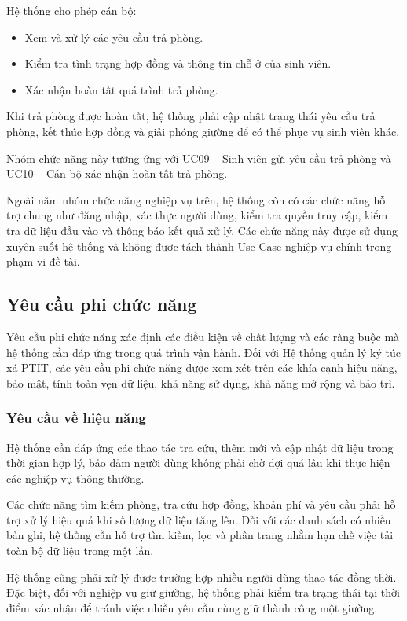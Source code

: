 Hệ thống cho phép cán bộ:

\begin{itemize}[leftmargin=1.4em]
\item Xem và xử lý các yêu cầu trả phòng.
\item Kiểm tra tình trạng hợp đồng và thông tin chỗ ở của sinh viên.
\item Xác nhận hoàn tất quá trình trả phòng.
\end{itemize}

Khi trả phòng được hoàn tất, hệ thống phải cập nhật trạng thái yêu cầu trả phòng, kết thúc hợp đồng và giải phóng giường để có thể phục vụ sinh viên khác.

Nhóm chức năng này tương ứng với UC09 – Sinh viên gửi yêu cầu trả phòng và UC10 – Cán bộ xác nhận hoàn tất trả phòng.

Ngoài năm nhóm chức năng nghiệp vụ trên, hệ thống còn có các chức năng hỗ trợ chung như đăng nhập, xác thực người dùng, kiểm tra quyền truy cập, kiểm tra dữ liệu đầu vào và thông báo kết quả xử lý. Các chức năng này được sử dụng xuyên suốt hệ thống và không được tách thành Use Case nghiệp vụ chính trong phạm vi đề tài.

\subsection{Yêu cầu phi chức năng}

Yêu cầu phi chức năng xác định các điều kiện về chất lượng và các ràng buộc mà hệ thống cần đáp ứng trong quá trình vận hành. Đối với Hệ thống quản lý ký túc xá PTIT, các yêu cầu phi chức năng được xem xét trên các khía cạnh hiệu năng, bảo mật, tính toàn vẹn dữ liệu, khả năng sử dụng, khả năng mở rộng và bảo trì.

\subsubsection{Yêu cầu về hiệu năng}

Hệ thống cần đáp ứng các thao tác tra cứu, thêm mới và cập nhật dữ liệu trong thời gian hợp lý, bảo đảm người dùng không phải chờ đợi quá lâu khi thực hiện các nghiệp vụ thông thường.

Các chức năng tìm kiếm phòng, tra cứu hợp đồng, khoản phí và yêu cầu phải hỗ trợ xử lý hiệu quả khi số lượng dữ liệu tăng lên. Đối với các danh sách có nhiều bản ghi, hệ thống cần hỗ trợ tìm kiếm, lọc và phân trang nhằm hạn chế việc tải toàn bộ dữ liệu trong một lần.

Hệ thống cũng phải xử lý được trường hợp nhiều người dùng thao tác đồng thời. Đặc biệt, đối với nghiệp vụ giữ giường, hệ thống phải kiểm tra trạng thái tại thời điểm xác nhận để tránh việc nhiều yêu cầu cùng giữ thành công một giường.

